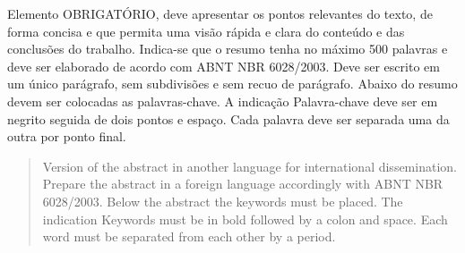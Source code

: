 \documentclass[mestre]{wstex}
\begin{document}
\begin{resumo}

	\noindent Elemento OBRIGATÓRIO, deve apresentar os pontos relevantes do texto,
	de forma concisa e que permita uma visão rápida e clara do conteúdo e das
	conclusões do trabalho. Indica-se que o resumo tenha no máximo 500 palavras e
	deve ser elaborado de acordo com ABNT NBR 6028/2003. Deve ser escrito em um
	único parágrafo, sem subdivisões e sem recuo de parágrafo. Abaixo do resumo
	devem ser colocadas as palavras-chave. A indicação Palavra-chave deve ser
	em negrito seguida de dois pontos e espaço. Cada palavra deve ser separada
	uma da outra por ponto final.

\end{resumo}


\begin{abstract}

	\noindent Version of the abstract in another language for international dissemination. Prepare the abstract in a foreign language accordingly with ABNT NBR 6028/2003. Below the abstract the keywords must be placed. The indication Keywords must be in bold followed by a colon and space. Each word must be separated from each other by a period.

\end{abstract}

\cleardoublepage
\begingroup
\renewcommand*{\addvspace}[1]{} %
\listoffigures
\endgroup
\end{document}
